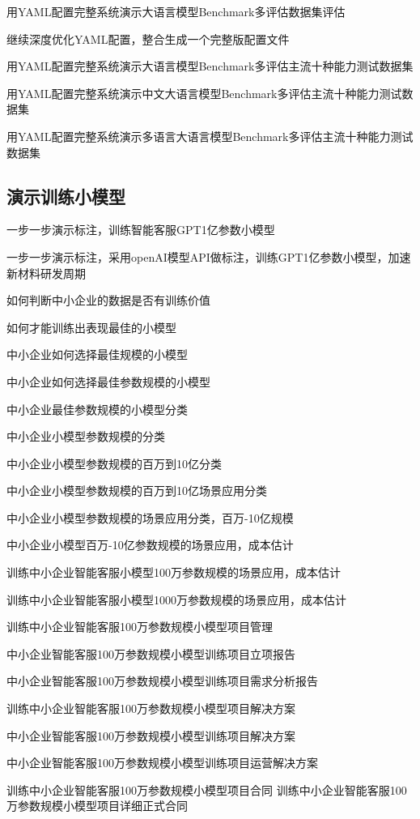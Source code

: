 \documentclass[12pt]{book}
\begin{document}
用YAML配置完整系统演示大语言模型Benchmark多评估数据集评估

继续深度优化YAML配置，整合生成一个完整版配置文件

用YAML配置完整系统演示大语言模型Benchmark多评估主流十种能力测试数据集

用YAML配置完整系统演示中文大语言模型Benchmark多评估主流十种能力测试数据集

用YAML配置完整系统演示多语言大语言模型Benchmark多评估主流十种能力测试数据集


\subsection{演示训练小模型}
一步一步演示标注，训练智能客服GPT1亿参数小模型

一步一步演示标注，采用openAI模型API做标注，训练GPT1亿参数小模型，加速新材料研发周期

如何判断中小企业的数据是否有训练价值

如何才能训练出表现最佳的小模型

中小企业如何选择最佳规模的小模型

中小企业如何选择最佳参数规模的小模型


中小企业最佳参数规模的小模型分类

中小企业小模型参数规模的分类


中小企业小模型参数规模的百万到10亿分类

中小企业小模型参数规模的百万到10亿场景应用分类

中小企业小模型参数规模的场景应用分类，百万-10亿规模


中小企业小模型百万-10亿参数规模的场景应用，成本估计

训练中小企业智能客服小模型100万参数规模的场景应用，成本估计

训练中小企业智能客服小模型1000万参数规模的场景应用，成本估计

训练中小企业智能客服100万参数规模小模型项目管理


中小企业智能客服100万参数规模小模型训练项目立项报告

中小企业智能客服100万参数规模小模型训练项目需求分析报告


训练中小企业智能客服100万参数规模小模型项目解决方案

中小企业智能客服100万参数规模小模型训练项目解决方案

中小企业智能客服100万参数规模小模型训练项目运营解决方案

训练中小企业智能客服100万参数规模小模型项目合同
训练中小企业智能客服100万参数规模小模型项目详细正式合同
\end{document}
